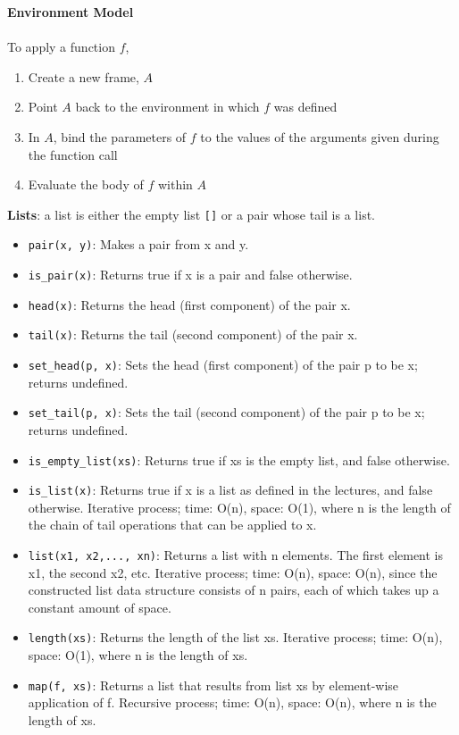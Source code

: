 \documentclass[a4paper]{article} \usepackage[backend=biber, style=numeric, sorting=none]{biblatex}
\begin{document}
\begin{multicols*}{4}
{\small\textbf{Environment Model}}
\\ \\
To apply a function $f$,
\begin{enumerate}
\itemsep -0.5em
\item Create a new frame, $A$
\item Point $A$ back to the environment in which $f$ was defined
\item In $A$, bind the parameters of $f$ to the values of the arguments given during the function call
\item Evaluate the body of $f$ within $A$
\end{enumerate}

{\small\textbf{Lists}}: a list is either the empty list \texttt{[]} or a pair whose tail is a list.
\begin{itemize}
\itemsep -0.5em
\item \texttt{pair(x, y)}: Makes a pair from x and y.
\item \texttt{is\_pair(x)}: Returns true if x is a pair and false otherwise.
\item \texttt{head(x)}: Returns the head (first component) of the pair x.
\item \texttt{tail(x)}: Returns the tail (second component) of the pair x.
\item \texttt{set\_head(p, x)}: Sets the head (first component) of the pair p to be x; returns undefined.
\item \texttt{set\_tail(p, x)}: Sets the tail (second component) of the pair p to be x; returns undefined.
\item \texttt{is\_empty\_list(xs)}: Returns true if xs is the empty list, and false otherwise.
\item \texttt{is\_list(x)}: Returns true if x is a list as defined in the lectures, and false otherwise. Iterative process; time: O(n), space: O(1), where n is the length of the chain of tail operations that can be applied to x.
\item \texttt{list(x1, x2,..., xn)}: Returns a list with n elements. The first element is x1, the second x2, etc. Iterative process; time: O(n), space: O(n), since the constructed list data structure consists of n pairs, each of which takes up a constant amount of space.
\item \texttt{length(xs)}: Returns the length of the list xs. Iterative process; time: O(n), space: O(1), where n is the length of xs.
\item \texttt{map(f, xs)}: Returns a list that results from list xs by element-wise application of f. Recursive process; time: O(n), space: O(n), where n is the length of xs.

\end{itemize}
\end{multicols*}
\end{document}
